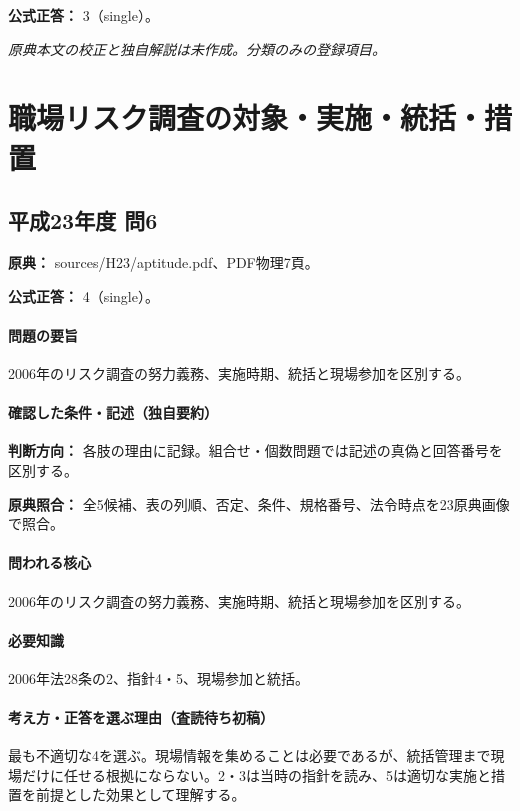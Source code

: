 \textbf{公式正答：} 3（single）。

\par\textit{原典本文の校正と独自解説は未作成。分類のみの登録項目。}

\section{職場リスク調査の対象・実施・統括・措置}

\subsection{平成23年度 問6}
\label{q:h23-reg-apt-06}

\noindent\textbf{原典：} sources/H23/aptitude.pdf、PDF物理7頁。

\textbf{公式正答：} 4（single）。

\paragraph{問題の要旨} 2006年のリスク調査の努力義務、実施時期、統括と現場参加を区別する。

\paragraph{確認した条件・記述（独自要約）}\mbox{}\par

\noindent\textbf{判断方向：} 各肢の理由に記録。組合せ・個数問題では記述の真偽と回答番号を区別する。\par

\noindent\textbf{原典照合：} 全5候補、表の列順、否定、条件、規格番号、法令時点を23原典画像で照合。\par

\paragraph{問われる核心} 2006年のリスク調査の努力義務、実施時期、統括と現場参加を区別する。

\paragraph{必要知識} 2006年法28条の2、指針4・5、現場参加と統括。

\paragraph{考え方・正答を選ぶ理由（査読待ち初稿）} 最も不適切な4を選ぶ。現場情報を集めることは必要であるが、統括管理まで現場だけに任せる根拠にならない。2・3は当時の指針を読み、5は適切な実施と措置を前提とした効果として理解する。

